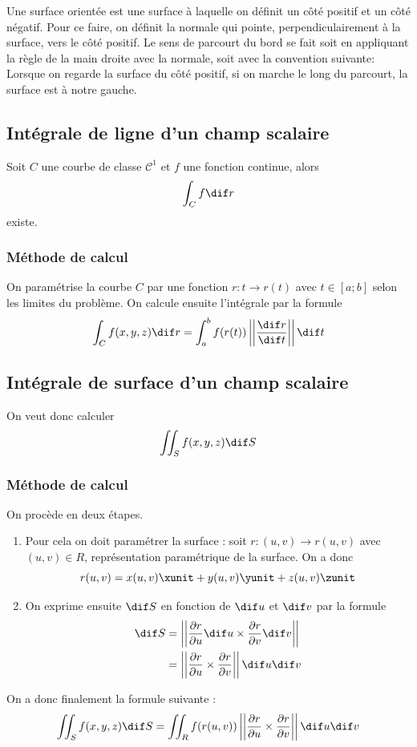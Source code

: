 \begin{mydef}
	Une surface orientée est une surface à laquelle on définit un côté positif et un côté négatif.
	Pour ce faire, on définit la normale qui pointe, perpendiculairement à la surface, vers le côté positif.
	Le sens de parcourt du bord se fait soit en appliquant la règle de la main droite avec la normale,
	soit avec la convention suivante:
	Lorsque on regarde la surface du côté positif, si on marche le long du parcourt, la surface est à notre gauche.
\end{mydef}

\subsection{Intégrale de ligne d'un champ scalaire}

\begin{mytheo}
	Soit $C$ une courbe de classe $\mathcal{C}^1$ et $f$ une fonction continue, alors
	\[ \int_C f \dif r \]
	existe.
\end{mytheo}

\subsubsection{Méthode de calcul}

On paramétrise la courbe $C$ par une fonction $r : t \to r(t)$ avec $t \in [a;b]$ selon les limites du problème. On calcule ensuite l'intégrale par la formule
\[ \int_C f(x,y,z) \dif r = \int_a^b f(r(t)) \left|\left| \frac{\dif r}{\dif t} \right|\right| \dif t \]

\subsection{Intégrale de surface d'un champ scalaire}

On veut donc calculer
\[ \iint_S f(x,y,z) \dif S \]

\subsubsection{Méthode de calcul}

On procède en deux étapes.
\begin{enumerate}
	\item Pour cela on doit paramétrer la surface : soit $r : (u,v) \to r(u,v)$ avec $(u,v) \in R$, représentation paramétrique de la surface. On a donc
		\[ r(u,v) = x(u,v) \xunit + y(u,v) \yunit + z(u,v) \zunit \]
	\item On exprime ensuite $\dif S$ en fonction de $\dif u$ et $\dif v$ par la formule
		\begin{align*} \dif S & = \left| \left| \frac{\pa r}{\pa u} \dif u \times \frac{\pa r}{\pa v} \dif v \right| \right| \\
			& = \left| \left| \frac{\pa r}{\pa u} \times \frac{\pa r}{\pa v} \right| \right|  \dif u \dif v
		\end{align*}
\end{enumerate}
On a donc finalement la formule suivante :
\[ \iint_S f(x,y,z) \dif S = \iint_R f(r(u,v)) \left| \left| \frac{\pa r}{\pa u} \times \frac{\pa r}{\pa v} \right| \right|  \dif u \dif v \]

